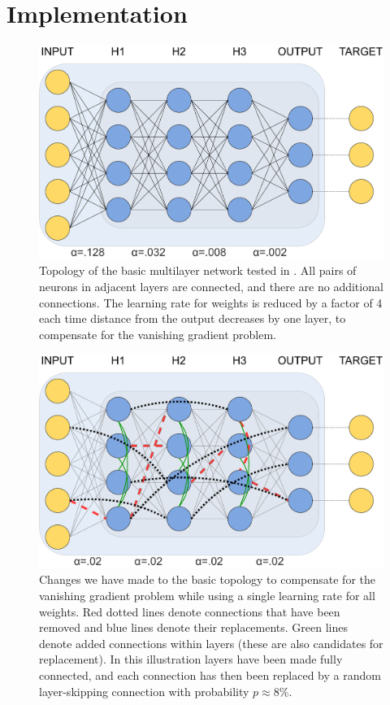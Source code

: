 \documentclass[format=sigconf]{acmart}
\begin{document}
\section{Implementation}

\begin{figure}
  \centering
    \includegraphics[width=\columnwidth]{figures/basic_topology_illustration.pdf}
    \caption{Topology of the basic multilayer network tested in \cite{scellier17}. All pairs of neurons in adjacent layers are connected, and there are no additional connections. The learning rate for weights is reduced by a factor of 4 each time distance from the output decreases by one layer, to compensate for the vanishing gradient problem.}
    \label{fig:top_basic}
\end{figure}
\hfill
\vspace{4mm}
\begin{figure}
	\centering
    \includegraphics[width=\columnwidth]{figures/topology_changes_illustration.pdf}
    \caption{Changes we have made to the basic topology to compensate for the vanishing gradient problem while using a single learning rate for all weights. Red dotted lines denote connections that have been removed and blue lines denote their replacements. Green lines denote added connections within layers (these are also candidates for replacement). In this illustration layers have been made fully connected, and each connection has then been replaced by a random layer-skipping connection with probability $p\approx 8\%$.}
    \label{fig:top_sw}
\end{figure}
\end{document}
